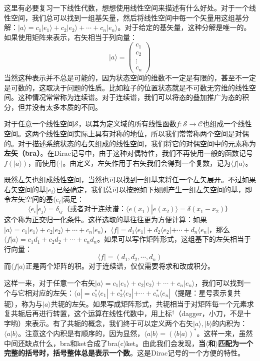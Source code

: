 \documentclass{ctexart}
\begin{document}
这里有必要复习一下线性代数，想想使用线性空间来描述有什么好处。对于一个线性空间，我们总可以找到一组基矢量，然后将线性空间中每一个矢量用这组基分解：$|a\rangle=c_1|e_1\rangle+c_2|e_2\rangle+\cdots+c_n|e_n\rangle$。对于给定的基矢量，这种分解是唯一的。如果使用矩阵来表示，右矢相当于列向量：
\begin{equation}
|a\rangle=\begin{pmatrix}c_1 \\ c_2 \\ \vdots\\ c_n\end{pmatrix}
\end{equation}
当然这种表示并不总是可能的，因为状态空间的维数不一定是有限的，甚至不一定是可数的，这取决于问题的性质。比如粒子的位置状态就是不可数无穷维的线性空间。这种情况常常称为连续谱。对于连续谱，我们可以将态的叠加推广为态的积分，但并没有太多本质的不同。

对于任意一个线性空间$\mathcal{S}$，以其为定义域的所有线性函数$f:\mathcal{S}\to\mathcal{C}$也组成一个线性空间。这两个线性空间实际上具有对称的地位，所以我们常常称两个空间是对偶的。对于描述系统状态的右矢组成的线性空间，我们将它的对偶空间中的元素称为\textbf{左矢（bra）}。在Dirac记号中，由于这种对偶特性，我们不再使用一般的函数记号$f(|a\rangle)$，而使用$\langle\cdot|$。由定义，左矢作用于右矢我们会得到一个复数，记为$\langle f|a\rangle$。

既然左矢也组成线性空间，当然也可以找到一组基来将任一个左矢展开。不过如果右矢空间的基$|e_i\rangle$已经确定，我们总可以按照如下规则产生一组左矢空间的基，即令左矢空间的基$\langle e_i|$满足：
\begin{equation}
\langle e_i|e_j\rangle=\delta_{ij}（或者对于连续谱：\langle e(x_1)|e(x_2)\rangle=\delta(x_1-x_2)）
\end{equation}
这个称为正交归一化条件。这样选取的基往往更为方便计算：如果$|a\rangle=c_1|e_1\rangle+c_2|e_2\rangle+\cdots+c_n|e_n\rangle$，$\langle f|=d_1\langle e_1|+d_2\langle e_2|+\cdots+d_n\langle e_n|$，那么$\langle f|a\rangle=c_1d_1+c_2d_2+\cdots+c_nd_n$。如果可以写作矩阵形式，这组基下的左矢相当于行向量：
\begin{equation}
\langle f|=(d_1,d_2,\cdots,d_n)
\end{equation}
而$\langle f|a\rangle$正是两个矩阵的积。对于连续谱，仅仅需要将求和改成积分。

这样一来，对于任意一个右矢$|a\rangle=c_1|e_1\rangle+c_2|e_2\rangle+\cdots+c_n|e_n\rangle$，我们可以找到一个与它相对应的左矢：$\langle a|=c^*_1\langle e_1|+c^*_2\langle e_2|+\cdots+c^*_n\langle e_n|$（提醒：星号表示复共轭），称为与$|a\rangle$共轭的左矢。如果写成矩阵形式，共轭相当于对矩阵每一个元素求复共轭后再进行转置，这个运算在线性代数中，用上标$^\dagger$（dagger，小刀，不是十字哟）来表示。有了共轭的概念，我们终于可以定义两个右矢$|a\rangle,|b\rangle$的内积为：$\langle a|b\rangle$。注意这个内积是有顺序的，因为显然，$\langle a|b\rangle=(\langle b|a\rangle)^*$。这样一来，虽然中间还缺点什么，bra和ket合成了bra(c)ket。由此我们会发现，\textbf{当$\langle$和$\rangle$匹配为一个完整的括号时，括号整体总是表示一个数}。这是Dirac记号的一个方便的特性。
\end{document}
